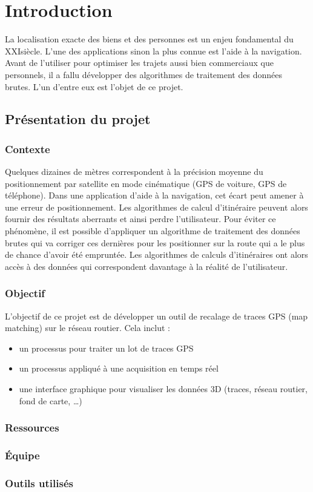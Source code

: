 \chapter{Introduction}
La localisation exacte des biens et des personnes est un enjeu fondamental du XXI\ieme siècle. L'une des applications sinon la plus connue est l'aide à la navigation. Avant de l'utiliser pour optimiser les trajets aussi bien commerciaux que personnels, il a fallu développer des algorithmes de traitement des données brutes. L'un d'entre eux est l'objet de ce projet. 
\section{Présentation du projet}
\subsection{Contexte}
Quelques dizaines de mètres correspondent à la précision moyenne du positionnement par satellite en mode cinématique (GPS de voiture, GPS de téléphone). Dans une application d'aide à la navigation, cet écart peut amener à une erreur de positionnement. Les algorithmes de calcul d'itinéraire peuvent alors fournir des résultats aberrants et ainsi perdre l'utilisateur. Pour éviter ce phénomène, il est possible d'appliquer un algorithme de traitement des données brutes qui va corriger ces dernières pour les positionner sur la route qui a le plus de chance d'avoir été empruntée. Les algorithmes de calculs d'itinéraires ont alors accès à des données qui correspondent davantage à la réalité de l'utilisateur.
\subsection{Objectif}
L'objectif de ce projet est de développer un outil de recalage de traces GPS (map matching) sur le réseau routier. Cela inclut :
\begin{itemize}
\item{} un processus pour traiter un lot de traces GPS
\item{} un processus appliqué à une acquisition en temps réel
\item{} une interface graphique pour visualiser les données 3D (traces, réseau routier, fond de carte, \dots)
\end{itemize}
\subsection{Ressources}
\subsection{\'Equipe}
\subsection{Outils utilisés}